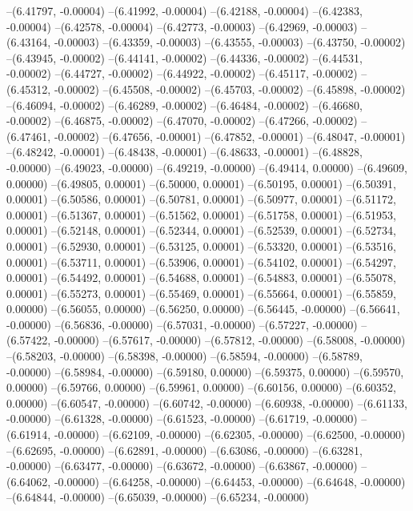 --(6.41797, -0.00004)
--(6.41992, -0.00004)
--(6.42188, -0.00004)
--(6.42383, -0.00004)
--(6.42578, -0.00004)
--(6.42773, -0.00003)
--(6.42969, -0.00003)
--(6.43164, -0.00003)
--(6.43359, -0.00003)
--(6.43555, -0.00003)
--(6.43750, -0.00002)
--(6.43945, -0.00002)
--(6.44141, -0.00002)
--(6.44336, -0.00002)
--(6.44531, -0.00002)
--(6.44727, -0.00002)
--(6.44922, -0.00002)
--(6.45117, -0.00002)
--(6.45312, -0.00002)
--(6.45508, -0.00002)
--(6.45703, -0.00002)
--(6.45898, -0.00002)
--(6.46094, -0.00002)
--(6.46289, -0.00002)
--(6.46484, -0.00002)
--(6.46680, -0.00002)
--(6.46875, -0.00002)
--(6.47070, -0.00002)
--(6.47266, -0.00002)
--(6.47461, -0.00002)
--(6.47656, -0.00001)
--(6.47852, -0.00001)
--(6.48047, -0.00001)
--(6.48242, -0.00001)
--(6.48438, -0.00001)
--(6.48633, -0.00001)
--(6.48828, -0.00000)
--(6.49023, -0.00000)
--(6.49219, -0.00000)
--(6.49414, 0.00000)
--(6.49609, 0.00000)
--(6.49805, 0.00001)
--(6.50000, 0.00001)
--(6.50195, 0.00001)
--(6.50391, 0.00001)
--(6.50586, 0.00001)
--(6.50781, 0.00001)
--(6.50977, 0.00001)
--(6.51172, 0.00001)
--(6.51367, 0.00001)
--(6.51562, 0.00001)
--(6.51758, 0.00001)
--(6.51953, 0.00001)
--(6.52148, 0.00001)
--(6.52344, 0.00001)
--(6.52539, 0.00001)
--(6.52734, 0.00001)
--(6.52930, 0.00001)
--(6.53125, 0.00001)
--(6.53320, 0.00001)
--(6.53516, 0.00001)
--(6.53711, 0.00001)
--(6.53906, 0.00001)
--(6.54102, 0.00001)
--(6.54297, 0.00001)
--(6.54492, 0.00001)
--(6.54688, 0.00001)
--(6.54883, 0.00001)
--(6.55078, 0.00001)
--(6.55273, 0.00001)
--(6.55469, 0.00001)
--(6.55664, 0.00001)
--(6.55859, 0.00000)
--(6.56055, 0.00000)
--(6.56250, 0.00000)
--(6.56445, -0.00000)
--(6.56641, -0.00000)
--(6.56836, -0.00000)
--(6.57031, -0.00000)
--(6.57227, -0.00000)
--(6.57422, -0.00000)
--(6.57617, -0.00000)
--(6.57812, -0.00000)
--(6.58008, -0.00000)
--(6.58203, -0.00000)
--(6.58398, -0.00000)
--(6.58594, -0.00000)
--(6.58789, -0.00000)
--(6.58984, -0.00000)
--(6.59180, 0.00000)
--(6.59375, 0.00000)
--(6.59570, 0.00000)
--(6.59766, 0.00000)
--(6.59961, 0.00000)
--(6.60156, 0.00000)
--(6.60352, 0.00000)
--(6.60547, -0.00000)
--(6.60742, -0.00000)
--(6.60938, -0.00000)
--(6.61133, -0.00000)
--(6.61328, -0.00000)
--(6.61523, -0.00000)
--(6.61719, -0.00000)
--(6.61914, -0.00000)
--(6.62109, -0.00000)
--(6.62305, -0.00000)
--(6.62500, -0.00000)
--(6.62695, -0.00000)
--(6.62891, -0.00000)
--(6.63086, -0.00000)
--(6.63281, -0.00000)
--(6.63477, -0.00000)
--(6.63672, -0.00000)
--(6.63867, -0.00000)
--(6.64062, -0.00000)
--(6.64258, -0.00000)
--(6.64453, -0.00000)
--(6.64648, -0.00000)
--(6.64844, -0.00000)
--(6.65039, -0.00000)
--(6.65234, -0.00000)
